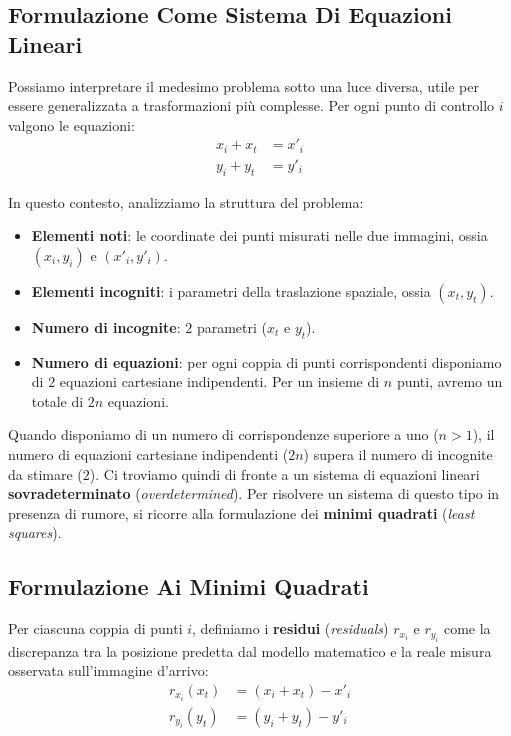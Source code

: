 ﻿\documentclass[11pt, a4paper]{article}
\begin{document}
\subsection{Formulazione Come Sistema Di Equazioni Lineari}

Possiamo interpretare il medesimo problema sotto una luce diversa, utile per essere generalizzata a trasformazioni più complesse. Per ogni punto di controllo $i$ valgono le equazioni:
\[
\begin{aligned}
x_i + x_t &= x'_i \\
y_i + y_t &= y'_i
\end{aligned}
\]

In questo contesto, analizziamo la struttura del problema:
\begin{itemize}[noitemsep]
    \item \textbf{Elementi noti}: le coordinate dei punti misurati nelle due immagini, ossia $(x_i, y_i)$ e $(x'_i, y'_i)$.
    \item \textbf{Elementi incogniti}: i parametri della traslazione spaziale, ossia $(x_t, y_t)$.
    \item \textbf{Numero di incognite}: $2$ parametri ($x_t$ e $y_t$).
    \item \textbf{Numero di equazioni}: per ogni coppia di punti corrispondenti disponiamo di $2$ equazioni cartesiane indipendenti. Per un insieme di $n$ punti, avremo un totale di $2n$ equazioni.
\end{itemize}

Quando disponiamo di un numero di corrispondenze superiore a uno ($n > 1$), il numero di equazioni cartesiane indipendenti ($2n$) supera il numero di incognite da stimare ($2$). Ci troviamo quindi di fronte a un sistema di equazioni lineari \textbf{sovradeterminato} (\emph{overdetermined}). Per risolvere un sistema di questo tipo in presenza di rumore, si ricorre alla formulazione dei \textbf{minimi quadrati} (\emph{least squares}).

\subsection{Formulazione Ai Minimi Quadrati}

Per ciascuna coppia di punti $i$, definiamo i \textbf{residui} (\emph{residuals}) $r_{x_i}$ e $r_{y_i}$ come la discrepanza tra la posizione predetta dal modello matematico e la reale misura osservata sull'immagine d'arrivo:
\[
\begin{aligned}
r_{x_i}(x_t) &= (x_i + x_t) - x'_i \\
r_{y_i}(y_t) &= (y_i + y_t) - y'_i
\end{aligned}
\]
\end{document}
